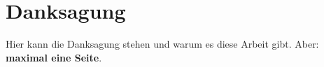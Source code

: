 
\thispagestyle{empty} 
\section*{Danksagung}
Hier kann die Danksagung stehen und warum es diese Arbeit gibt.
Aber: \textbf{maximal eine Seite}.
\cleardoubleoddpage
